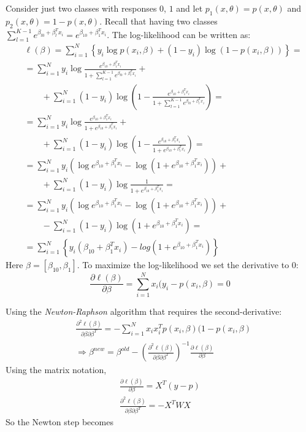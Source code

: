 \documentclass[12pt, letterpaper]{article}
\theoremstyle{definition}
\begin{document}
Consider just two classes with responses $0$, $1$ and let $p_1(x,\theta) =p(x,\theta) $ and $p_2(x,\theta) =1-p(x,\theta)$. Recall that having two classes $\sum_{l=1}^{K-1} e^{\beta_{l0}+\beta_l^Tx_i} = e^{\beta_{10}+\beta_1^Tx_i}$. The log-likelihood can be written as:
\begin{equation}
\begin{aligned}
&\ell(\beta) = \sum_{i=1}^N \left\lbrace y_i \log p\left(x_i,\beta\right) + \left(1-y_i\right) \log \left(1-p\left(x_i,\beta\right)\right)\right\rbrace =\\
&=\sum_{i=1}^N y_i \log \frac{e^{\beta_{10} +\beta_{1}^T x_i}}{1+\sum_{l=1}^{K-1} e^{\beta_{l0}+\beta_l^Tx_i}}  +\\
& \quad\quad + \sum_{i=1}^N \left(1-y_i\right) \log \left(1-\frac{e^{\beta_{10} +\beta_{1}^T x_i}}{1+\sum_{l=1}^{K-1} e^{\beta_{l0}+\beta_l^Tx_i}}\right)= \\
&= \sum_{i=1}^N  y_i \log \frac{e^{\beta_{10} +\beta_{1}^T x_i}}{1+e^{\beta_{10}+\beta_1^Tx_i}} + \\
&\quad\quad +\sum_{i=1}^N  \left(1-y_i\right) \log \left(1-\frac{e^{\beta_{10} +\beta_{1}^T x_i}}{1+e^{\beta_{10}+\beta_1^Tx_i}}\right) = \\
&=\sum_{i=1}^N y_i \left(\log e^{\beta_{10} +\beta_{1}^T x_i} -\log \left(1+ e^{\beta_{10}+\beta_1^Tx_i}\right) \right) + \\
& \quad\quad + \sum_{i=1}^N  \left(1-y_i\right) \log \frac{1}{1+ e^{\beta_{10}+\beta_1^Tx_i}} = \\
&=\sum_{i=1}^N y_i \left(\log e^{\beta_{10} +\beta_{1}^T x_i} -\log \left(1+ e^{\beta_{10}+\beta_1^Tx_i}\right) \right) + \\
& \quad\quad - \sum_{i=1}^N\left(1-y_i\right) \log \left(1+ e^{\beta_{10}+\beta_1^Tx_i}\right) = \\
&=\sum_{i=1}^N \left\lbrace y_i \left(\beta_{10} +\beta_{1}^T x_i \right) -log \left(1+ e^{\beta_{10}+\beta_1^Tx_i}\right) \right\rbrace
\end{aligned}
\end{equation}
Here $\beta = \left[ \beta_{10}, \beta_1\right]$. To maximize the log-likelihood we set the derivative to $0$:
\begin{equation}
\frac{\partial \ell(\beta)}{\partial \beta} = \sum_{i=1}^N x_i  (y_i - p(x_i, \beta) = 0
\end{equation}

Using the \textit{Newton-Raphson} algorithm that requires the second-derivative:
\begin{align}
&\frac{\partial^2 \ell(\beta)}{\partial \beta \partial \beta^T} = -\sum_{i=1}^N x_ix_i^T   p(x_i, \beta) (1-p(x_i, \beta)\\
&\Rightarrow \beta^{new} = \beta^{old} - \left( \frac{\partial^2 \ell\left( \beta\right) }{\partial \beta \partial \beta^T} \right)^{-1}\frac{\partial \ell(\beta)}{\partial \beta}
\end{align}
Using the matrix notation,
\begin{align}
\frac{\partial \ell(\beta)}{\partial \beta} =  X^T (y-p) \\
\frac{\partial^2 \ell(\beta)}{\partial \beta \partial \beta^T} = -X^TWX
\end{align}
So the Newton step becomes
\end{document}
